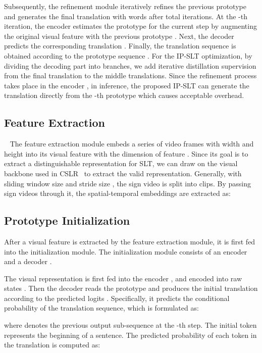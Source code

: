 \documentclass[10pt,twocolumn,letterpaper]{article}
\begin{document}
    Subsequently, the refinement module iteratively refines the previous prototype and generates the final translation  with  words after total  iterations.
    At the -th iteration, the encoder  estimates the prototype  for the current step by augmenting the original visual feature  with the previous prototype . 
    Next, the decoder  predicts the corresponding translation . 
    Finally, the translation sequence  is obtained according to the prototype sequence . For the IP-SLT optimization, by dividing the decoding part into  branches, we add iterative distillation supervision from the final translation to the middle translations. Since the refinement process takes place in the encoder , in inference, the proposed IP-SLT can generate the translation directly from the -th prototype which causes acceptable overhead.

    \subsection{Feature Extraction}~\label{Sec3.2}
    The feature extraction module embeds a series of video frames  with width  and height  into its visual feature  with the dimension of feature . Since its goal is to extract a distinguishable representation for SLT, we can draw on the visual backbone used in CSLR~\cite{cui2019deep, koller2016deep,koller2019weakly, cui2017recurrent} to extract the valid representation. 
    Generally, with sliding window size  and stride size , the sign video is split into  clips. By passing sign videos through it, the spatial-temporal embeddings  are extracted as:
    
    
    \subsection{Prototype Initialization} 
    After a visual feature  is extracted by the feature extraction module, it is first fed into the initialization module. The initialization module consists of an encoder  and a decoder .


    
    
    The visual representation  is first fed into the encoder , and encoded into  raw states . Then the decoder  reads the prototype  and produces the initial translation  according to the predicted logits . 
    Specifically, it predicts the conditional probability of the translation sequence, which is formulated as: \vspace{-1mm}
    
    where  denotes the previous output sub-sequence at the -th step. The initial token  represents the beginning of a sentence.
    The predicted probability of each token in the translation is computed as:\vspace{-1mm}
    
\end{document}
